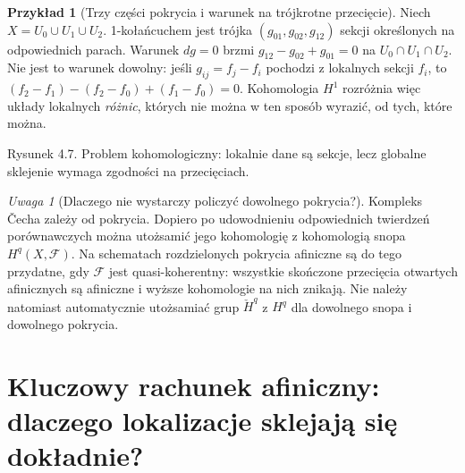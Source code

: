 \documentclass[11pt,a4paper,openany]{report}
\numberwithin{equation}{section}
\theoremstyle{plain}
\theoremstyle{definition}
\newtheorem{przyklad}[twierdzenie]{Przykład}
\theoremstyle{remark}
\newtheorem{uwaga}[twierdzenie]{Uwaga}
\begin{document}
\begin{przyklad}[Trzy części pokrycia i warunek na trójkrotne przecięcie]
Niech $X=U_0\cup U_1\cup U_2$. 1-kołańcuchem jest
trójka $(g_{01},g_{02},g_{12})$ sekcji określonych
na odpowiednich parach. Warunek $dg=0$ brzmi
$g_{12}-g_{02}+g_{01}=0$ na $U_0\cap U_1\cap U_2$.
Nie jest to warunek dowolny: jeśli $g_{ij}=f_j-f_i$
pochodzi z lokalnych sekcji $f_i$, to
$(f_2-f_1)-(f_2-f_0)+(f_1-f_0)=0$.
Kohomologia $H^1$ rozróżnia więc układy lokalnych
\emph{różnic}, których nie można w ten sposób wyrazić,
od tych, które można.
\end{przyklad}

\begin{center}

{\small Rysunek 4.7. Problem kohomologiczny: lokalnie dane są
sekcje, lecz globalne sklejenie wymaga zgodności na przecięciach.}
\end{center}

\begin{uwaga}[Dlaczego nie wystarczy policzyć dowolnego pokrycia?]
Kompleks Čecha zależy od pokrycia. Dopiero po udowodnieniu
odpowiednich twierdzeń porównawczych można utożsamić jego
kohomologię z kohomologią snopa $H^q(X,\mathcal F)$.
Na schematach rozdzielonych pokrycia afiniczne są do tego
przydatne, gdy $\mathcal F$ jest quasi-koherentny:
wszystkie skończone przecięcia otwartych afinicznych są
afiniczne i wyższe kohomologie na nich znikają.
Nie należy natomiast automatycznie utożsamiać grup
$\check H^q$ z $H^q$ dla dowolnego snopa i dowolnego pokrycia.
\end{uwaga}

\section{Kluczowy rachunek afiniczny: dlaczego lokalizacje sklejają się dokładnie?}
\label{sec:affine-cech-proof}
\end{document}
